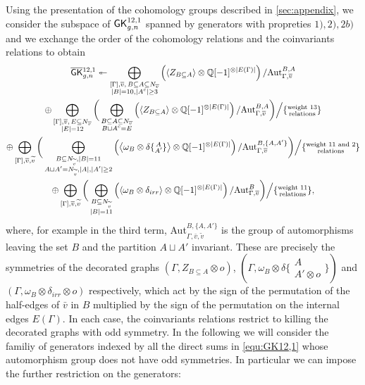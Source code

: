 Using the presentation of the cohomology groups described in \ref{sec:appendix}, we consider the subspace of  $\mathsf{GK}_{g,n}^{12,1}$  spanned by generators with propreties $1),2),2b)$ and we exchange the order of the cohomology relations and the coinvariants relations to obtain 
\begin{multline}\label{equ:GK12,1}
    \overline{\mathsf{GK}}{}_{g,n}^{12,1}  \twoheadleftarrow  \bigoplus_{\substack{[\Gamma],\overline{v},\,B\subseteq A\subseteq N_{\overline{v}} \\ |B|=10, |A^c|\geq 3}} \left( \left<Z_{B\subseteq A}\right> \otimes \mathbb{Q}[-1]^{\otimes |E(\Gamma)|} \right)/\text{Aut}_{\Gamma,\overline{v}}^{B,A} \\
    \oplus \bigoplus_{\substack{[\Gamma],\overline{v},\,E\subseteq N_{\overline{v}} \\ |E|=12}} \bigg( \bigoplus_{\substack{B\subseteq A\subseteq N_{\overline{v}} \\  B\sqcup A^c=E}} \left( \left<Z_{B\subseteq A}\right> \otimes \mathbb{Q}[-1]^{\otimes |E(\Gamma)|} \right)/\text{Aut}_{\Gamma,\overline{v}}^{B,A} \bigg) \Big/ \{\substack{\text{weight 13}\\\text{relations}}\} \\
    \oplus \bigoplus_{[\Gamma],\overline{v},\widetilde{v}} \bigg( \bigoplus_{\substack{B\subseteq N_{\widetilde{v}},|B|=11\\ A\sqcup A'=N_{\widetilde{v}},|A|,|A'|\geq 2}} \left( \left<\omega_B\otimes\delta\{\substack{A \\ A'}\}\right> \otimes \mathbb{Q}[-1]^{\otimes |E(\Gamma)|}\right) / \text{Aut}_{\Gamma,\overline{v}}^{B,\{A,A'\} } \bigg) \Big/ \{\substack{\text{weight 11 and 2}\\\text{relations}}\} \\
    \oplus \bigoplus_{[\Gamma],\overline{v},\widetilde{v}} \bigg( \bigoplus_{\substack{B\subseteq N_{\widetilde{v}}\\ |B|=11}} \left( \left<\omega_B\otimes \delta_{irr}\right> \otimes \mathbb{Q}[-1]^{\otimes |E(\Gamma)|}\right) / \text{Aut}_{\Gamma,\overline{v}}^B \bigg) \Big/ \{\substack{\text{weight 11}\\\text{relations}}\} ,
\end{multline}
where, for example in the third term, Aut$_{\Gamma,\bar{v},\tilde{v}}^{B,\{A,A'\}}$ is the group of automorphisms leaving the set $B$ and the partition $A\sqcup A'$ invariant.
These are precisely the symmetries of the decorated graphs $(\Gamma,Z_{B\subseteq A}\otimes o)$, $(\Gamma,\omega_B\otimes\delta\{\substack{A \\ A'\otimes o}\})$ and $(\Gamma,\omega_B\otimes \delta_{irr}\otimes o)$ respectively, which act by the sign of the permutation of the half-edges of $\bar{v}$ in $B$ multiplied by the sign of the permutation on the internal edges $E(\Gamma)$. In each case, the coinvariants relations restrict to killing the decorated graphs with odd symmetry. In the following we will consider the familiy of generators indexed by all the direct sums in \ref{equ:GK12,1} whose automorphism group does not have odd symmetries. In particular we can impose the further restriction on the generators:
